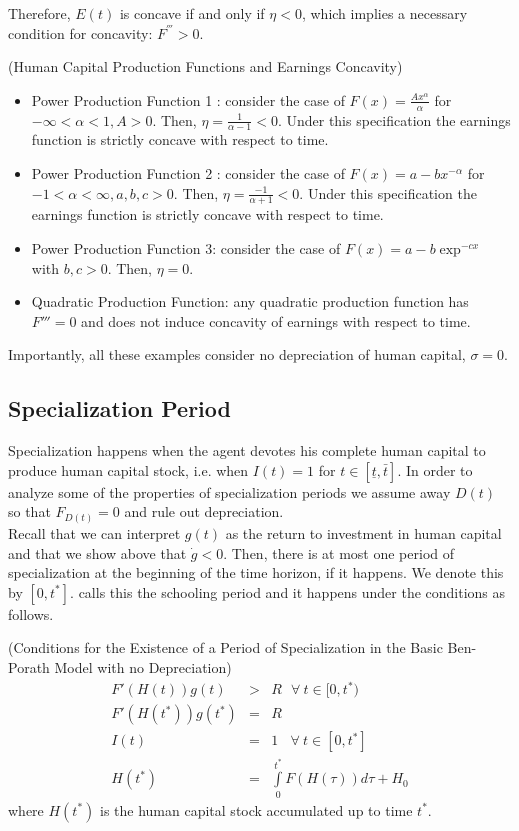 \indent  Therefore, ${E(t)}$ is concave if and only if $\eta < 0$, which implies a necessary condition for concavity: $F^{'''}>0$.

\begin{example} (Human Capital Production Functions and Earnings Concavity)
\begin{itemize}
\item Power Production Function 1 : consider the case of $F(x) = \frac{Ax^{\alpha}}{\alpha}$ for $ - \infty < \alpha < 1, A > 0$. Then, $\eta = \frac{1}{\alpha - 1} < 0$. Under this specification the earnings function is strictly concave with respect to time.
\item Power Production Function 2 : consider the case of $F(x) = a - b x ^ {- \alpha}$ for $ - 1 < \alpha < \infty, a,b,c > 0$. Then, $\eta = \frac{-1}{\alpha + 1} < 0$. Under this specification the earnings function is strictly concave with respect to time.
\item Power Production Function 3: consider the case of $F(x) = a - b \exp^{-cx}$ with $b,c > 0$. Then, $\eta = 0$. 
\item Quadratic Production Function: any quadratic production function has $F''' = 0$ and does not induce concavity of earnings with respect to time. 
\end{itemize}
\noindent Importantly, all these examples consider no depreciation of human capital, $\sigma = 0$. 
\end{example} 

\subsection{Specialization Period} \label{section:specialization}
Specialization happens when the agent devotes his complete human capital to produce human capital stock, i.e. when $I(t) = 1$ for $t \in [ \underline{t}, \bar{t}]$. In order to analyze some of the properties of specialization periods we assume away $D(t)$ so that $F_{D(t)} = 0$ and rule out depreciation.\\
\indent Recall that we can interpret $g(t)$ as the return to investment in human capital and that we show above that $\dot{g} < 0$. Then, there is at most one period of specialization at the beginning of the time horizon, if it happens. We denote this by $[0,t^*]$. \citet{ben1967production} calls this the schooling period and it happens under the conditions as follows.

\begin{condition} (Conditions for the Existence of a Period of Specialization in the Basic Ben-Porath Model with no Depreciation)
\begin{eqnarray}
F'(H(t))g(t) &>& R\ \ \ \forall \ t\in [0,t^*) \nonumber \\
F'(H(t^*))g(t^*) &=& R\nonumber \\
I(t) &=& 1\ \ \ \ \forall \ t\in [0,t^*] \nonumber \\
H(t^*) &=& \int \limits _{0} ^{t^*} F (H(\tau)) d\tau + H_{0} \label{eq:humantstar}
\end{eqnarray} 
\noindent where $H(t^*)$ is the human capital stock accumulated up to time $t^*$.\\
\end{condition}

